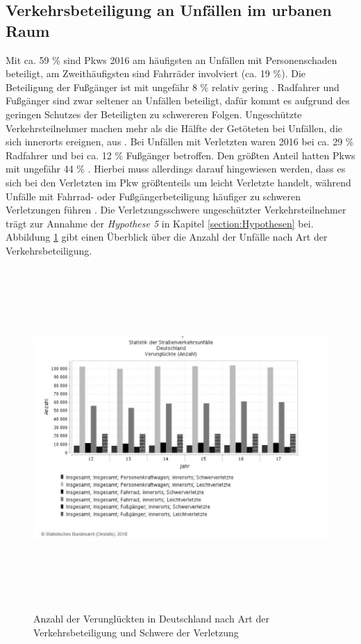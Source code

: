 \subsection{Verkehrsbeteiligung an Unfällen im urbanen Raum} 
Mit ca. 59 \% sind Pkws 2016 am häufigsten an Unfällen mit Personenschaden beteiligt, am Zweithäufigsten sind Fahrräder involviert (ca. 19 \%). Die Beteiligung der Fußgänger ist mit ungefähr 8 \% relativ gering \parencite[S. 102]{StatistischesBundesamt.2018c}. Radfahrer und Fußgänger sind zwar seltener an Unfällen beteiligt, dafür kommt es aufgrund des geringen Schutzes der Beteiligten zu schwereren Folgen. Ungeschützte Verkehrsteilnehmer machen mehr als die Hälfte der Getöteten bei Unfällen, die sich innerorts ereignen, aus \parencite[S. 221]{Schreiber.2014}. Bei Unfällen mit Verletzten waren 2016 bei ca. 29 \% Radfahrer und bei ca. 12 \% Fußgänger betroffen. Den größten Anteil hatten Pkws mit ungefähr 44 \% \parencite[S. 139-142]{StatistischesBundesamt.2018c}. Hierbei muss allerdings darauf hingewiesen werden, dass es sich bei den Verletzten im Pkw größtenteils um leicht Verletzte handelt, während Unfälle mit Fahrrad- oder Fußgängerbeteiligung häufiger zu schweren Verletzungen führen \parencite[S. 145-148]{StatistischesBundesamt.2018c}. Die Verletzungsschwere ungeschützter Verkehrsteilnehmer trägt zur Annahme der \textit{Hypothese 5} in Kapitel \ref{section:Hypothesen} bei. Abbildung \ref{fig:Verkehrsbeteiligung} gibt einen Überblick über die Anzahl der Unfälle nach Art der Verkehrsbeteiligung.

\begin{savenotes}
	\begin{figure}[H]
		\centering
		\includegraphics[width=17cm,height=13cm]{figures/Verkehrsbeteiligung}
		\caption[Anzahl der Unfälle innersorts nach Art der Verkehrsbeteiligung]{Anzahl der Verunglückten in Deutschland nach Art der Verkehrsbeteiligung und Schwere der Verletzung \parencite{StatistischesBundesamt.2018d}}\label{fig:Verkehrsbeteiligung}
	\end{figure}
\end{savenotes}

